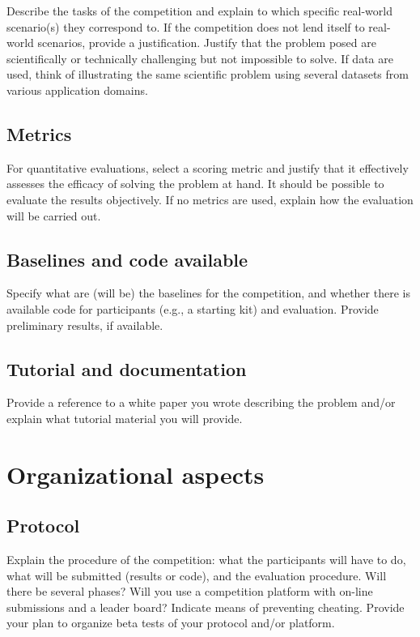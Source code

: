 \documentclass[11pt, oneside]{article}
\begin{document}
Describe the tasks of the competition and explain to which specific real-world scenario(s) they correspond to. If the competition does not lend itself
to real-world scenarios, provide a justification. Justify that the problem posed are scientifically or technically challenging but not impossible to
solve. If data are used, think of illustrating the same scientific problem using several datasets from various application domains.


\subsection{Metrics}

For quantitative evaluations, select a scoring metric and justify
that it effectively assesses the efficacy of solving the problem
at hand. It should be possible to evaluate the results
objectively. If no metrics are used, explain how the evaluation
will be carried out.

\subsection{Baselines and code available}

Specify what are (will be) the baselines for the competition, and
whether there is available code for participants (e.g., a starting
kit) and evaluation. Provide preliminary results, if available.

\subsection{Tutorial and documentation}

Provide a reference to a white paper you wrote describing the
problem and/or explain what tutorial material you will provide.


\section{Organizational aspects}
\subsection{Protocol}

Explain the procedure of the competition: what the participants will have to do, what will be submitted (results or code), and the evaluation procedure.
Will there be several phases? Will you use a competition platform with on-line submissions and a leader board? Indicate means of preventing cheating.
Provide your plan to organize beta tests of your protocol and/or platform.
\end{document}
